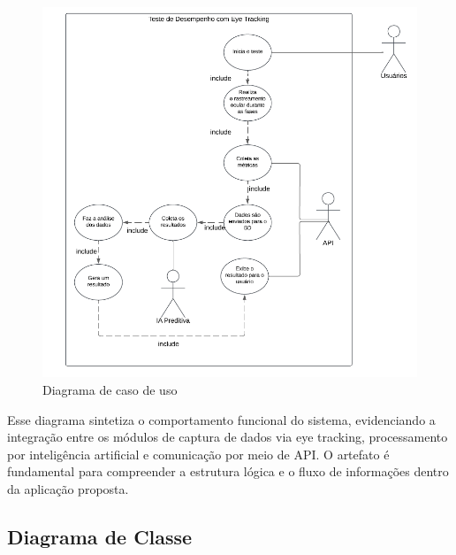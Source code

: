 \documentclass[
  a4paper,%
  12pt,%
  english,%
  brazilian,%
]{article}
\begin{document}
\begin{figure}[H]
\centering
\caption{Diagrama de caso de uso}%
\label{fig:caso-de-uso}
 \includegraphics[width=1.1\textwidth]{Logos/caso-de-uso.png}
\end{figure}


    Esse diagrama sintetiza o comportamento funcional do sistema, evidenciando a integração entre os módulos de captura de dados via eye tracking, processamento por inteligência artificial e comunicação por meio de API. O artefato é fundamental para compreender a estrutura lógica e o fluxo de informações dentro da aplicação proposta.
    
    \subsection*{Diagrama de Classe}
\end{document}
